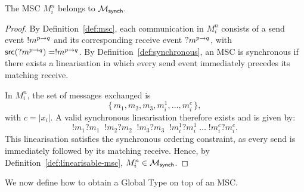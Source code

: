 \bigskip

\begin{lemma}\label{lemma:minsynch}
The MSC $M_i^n$ belongs to $\mscsetofmodel{\synchmodel}$.
\end{lemma}

\begin{proof}
By Definition~\ref{def:msc}, each communication in $M_i^n$
consists of a send event $\send{p}{q}{m}$ and its corresponding
receive event $\recv{p}{q}{m}$, with $\source(\recv{p}{q}{m}) =
\send{p}{q}{m}$.  
By Definition~\ref{def:synchronous}, an MSC is synchronous
if there exists a linearisation in which every send event
immediately precedes its matching receive.

In $M_i^n$, the set of messages exchanged is
\[
\{\, m_1, m_2, m_3, m_i^1, \ldots, m_i^c \,\},
\]
with $c = |x_i|$.  
A valid synchronous linearisation therefore exists and is given by:
\[
!m_1 ?m_1\;\; !m_2 ?m_2\;\; !m_3 ?m_3\;\;
!m_i^1 ?m_i^1 \;\ldots\; !m_i^c ?m_i^c.
\]
This linearisation satisfies the synchronous ordering constraint,
as every send is immediately followed by its matching receive.
Hence, by Definition~\ref{def:linearisable-msc},  
$M_i^n \in \mscsetofmodel{\synchmodel}$.
\end{proof}

We now define how to obtain a Global Type on top of an MSC.

\bigskip

